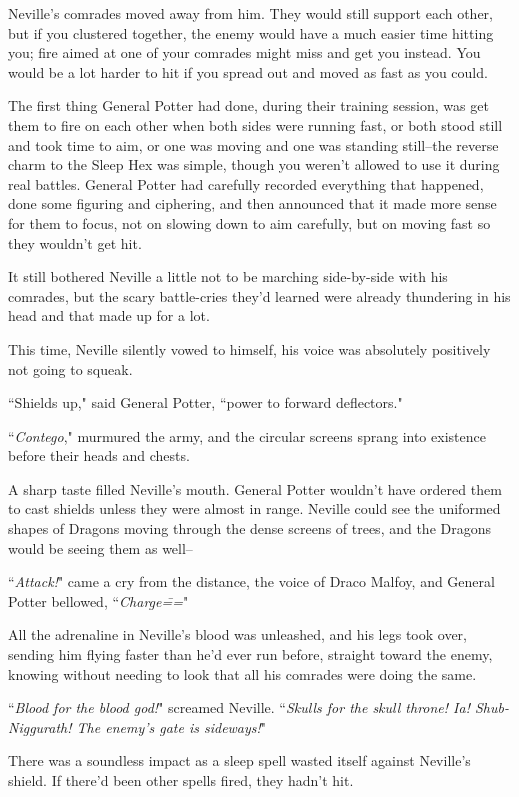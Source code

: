 Neville's comrades moved away from him. They would still support each other, but if you clustered together, the enemy would have a much easier time hitting you; fire aimed at one of your comrades might miss and get you instead. You would be a lot harder to hit if you spread out and moved as fast as you could.

The first thing General Potter had done, during their training session, was get them to fire on each other when both sides were running fast, or both stood still and took time to aim, or one was moving and one was standing still\---the reverse charm to the Sleep Hex was simple, though you weren't allowed to use it during real battles. General Potter had carefully recorded everything that happened, done some figuring and ciphering, and then announced that it made more sense for them to focus, not on slowing down to aim carefully, but on moving fast so they wouldn't get hit.

It still bothered Neville a little not to be marching side-by-side with his comrades, but the scary battle-cries they'd learned were already thundering in his head and that made up for a lot.

This time, Neville silently vowed to himself, his voice was absolutely positively not going to squeak.

``Shields up," said General Potter, ``power to forward deflectors."

``\emph{Contego}," murmured the army, and the circular screens sprang into existence before their heads and chests.

A sharp taste filled Neville's mouth. General Potter wouldn't have ordered them to cast shields unless they were almost in range. Neville could see the uniformed shapes of Dragons moving through the dense screens of trees, and the Dragons would be seeing them as well\---

``\emph{Attack!}" came a cry from the distance, the voice of Draco Malfoy, and General Potter bellowed, ``\emph{Charge\===}"

All the adrenaline in Neville's blood was unleashed, and his legs took over, sending him flying faster than he'd ever run before, straight toward the enemy, knowing without needing to look that all his comrades were doing the same.

``\emph{Blood for the blood god!}" screamed Neville. ``\emph{Skulls for the skull throne! Ia! Shub-Niggurath! The enemy's gate is sideways!}"

There was a soundless impact as a sleep spell wasted itself against Neville's shield. If there'd been other spells fired, they hadn't hit.


